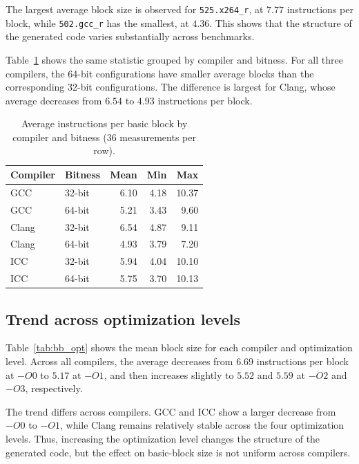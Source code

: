 \documentclass[11pt,a4paper]{article}
\newcommand{\bench}[1]{\texttt{#1}}
\begin{document}
The largest average block size is observed for \bench{525.x264\_r}, at
$7.77$ instructions per block, while \bench{502.gcc\_r} has the smallest,
at $4.36$. This shows that the structure of the generated code varies
substantially across benchmarks.

Table~\ref{tab:bb_compiler_bitness} shows the same statistic grouped by
compiler and bitness. For all three compilers, the 64-bit configurations have
smaller average blocks than the corresponding 32-bit configurations. The
difference is largest for Clang, whose average decreases from $6.54$ to
$4.93$ instructions per block.

\begin{table}[H]
\centering
\caption{Average instructions per basic block by compiler and bitness (36 measurements per row).}
\label{tab:bb_compiler_bitness}
\begin{tabular}{llrrr}
\toprule
Compiler & Bitness & Mean & Min & Max \\
\midrule
GCC   & 32-bit & 6.10 & 4.18 & 10.37 \\
GCC   & 64-bit & 5.21 & 3.43 & 9.60 \\
Clang & 32-bit & 6.54 & 4.87 & 9.11 \\
Clang & 64-bit & 4.93 & 3.79 & 7.20 \\
ICC   & 32-bit & 5.94 & 4.04 & 10.10 \\
ICC   & 64-bit & 5.75 & 3.70 & 10.13 \\
\bottomrule
\end{tabular}
\end{table}

\subsection{Trend across optimization levels}

Table~\ref{tab:bb_opt} shows the mean block size for each compiler and
optimization level. Across all compilers, the average decreases from
$6.69$ instructions per block at $-O0$ to $5.17$ at $-O1$, and then increases
slightly to $5.52$ and $5.59$ at $-O2$ and $-O3$, respectively.

The trend differs across compilers. GCC and ICC show a larger decrease from
$-O0$ to $-O1$, while Clang remains relatively stable across the four
optimization levels. Thus, increasing the optimization level changes the
structure of the generated code, but the effect on basic-block size is not
uniform across compilers.
\end{document}
